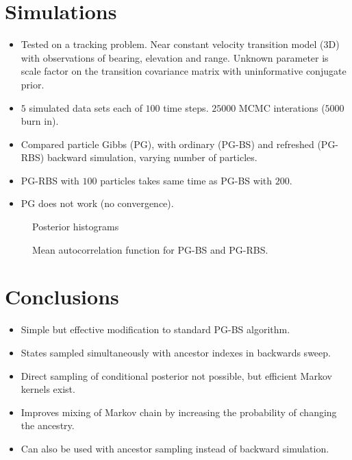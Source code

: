 \documentclass[landscape,a0,plainboxedsections]{sciposter}
\newcommand{\ti}{t}
\newcommand{\pw}[1]{w_{#1}}
\newcommand{\ppw}[1]{v_{#1}}
\newcommand{\pss}[1]{^{(#1)}}
\begin{document}
\begin{multicols}{4}
\section{Simulations}
\begin{itemize}
 \item Tested on a tracking problem. Near constant velocity transition model (3D) with observations of bearing, elevation and range. Unknown parameter is scale factor on the transition covariance matrix with uninformative conjugate prior.
 \item $5$ simulated data sets each of $100$ time steps. $25000$ MCMC interations ($5000$ burn in).
 \item Compared particle Gibbs (PG), with ordinary (PG-BS) and refreshed (PG-RBS) backward simulation, varying number of particles.
 \item PG-RBS with $100$ particles takes same time as PG-BS with $200$.
 \item PG does not work (no convergence).
\end{itemize}

\begin{figure}
\centering
\subfigure[{\small PG-BS ($N=100$)}]{  }
\subfigure[{\small PG-BS ($N=200$)}]{  }
\subfigure[{\small PG-RBS ($N=100$)}]{  }
\caption{Posterior histograms}
\label{fig:sample_hist}
\end{figure}
%
\begin{figure}
\centering

\caption{Mean autocorrelation function for PG-BS and PG-RBS.}
\label{fig:acf}
\end{figure}
\vspace{-2cm}
%
%
%
\section{Conclusions}
\begin{itemize}
 \item Simple but effective modification to standard PG-BS algorithm.
 \item States sampled simultaneously with ancestor indexes in backwards sweep.
 \item Direct sampling of conditional posterior not possible, but efficient Markov kernels exist.
 \item Improves mixing of Markov chain by increasing the probability of changing the ancestry.
 \item Can also be used with ancestor sampling \cite{Lindsten2014} instead of backward simulation.
\end{itemize}




{ \small

%

}
\vfill

\end{multicols}
\end{document}
